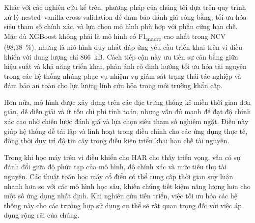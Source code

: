 Khác với các nghiên cứu kể trên, phương pháp của chúng tôi dựa trên quy trình xử lý nested–vanilla cross-validation để đảm bảo đánh giá công bằng, tối ưu hóa siêu tham số chính xác, và lựa chọn mô hình phù hợp với phần cứng hạn chế. Mặc dù XGBoost không phải là mô hình có F1\textsubscript{macro} cao nhất trong NCV (98,38~\%), nhưng là mô hình duy nhất đáp ứng yêu cầu triển khai trên vi điều khiển với dung lượng chỉ 866~kB. Cách tiếp cận này ưu tiên sự cân bằng giữa hiệu suất và khả năng triển khai, phản ánh rõ định hướng tối ưu hóa tài nguyên trong các hệ thống nhúng phục vụ nhiệm vụ giám sát trạng thái tác nghiệp và đảm bảo an toàn cho lực lượng lính cứu hỏa trong môi trường khẩn cấp.

Hơn nữa, mô hình được xây dựng trên các đặc trưng thống kê miền thời gian đơn giản, dễ diễn giải và ít tốn chi phí tính toán, nhưng vẫn đủ mạnh để đạt độ chính xác cao nhờ chiến lược đánh giá và lựa chọn siêu tham số nghiêm ngặt. Điều này giúp hệ thống dễ tái lập và linh hoạt trong điều chỉnh cho các ứng dụng thực tế, đồng thời duy trì độ tin cậy trong điều kiện triển khai hạn chế tài nguyên.

Trong khi học máy trên vi điều khiển cho HAR cho thấy triển vọng, vẫn có sự đánh đổi giữa độ phức tạp của mô hình, độ chính xác và mức tiêu thụ tài nguyên. Các thuật toán học máy cổ điển có thể cung cấp thời gian suy luận nhanh hơn so với các mô hình học sâu, khiến chúng tiết kiệm năng lượng hơn cho một số ứng dụng nhất định. Khi nghiên cứu tiến triển, việc tối ưu hóa các hệ thống này cho các trường hợp sử dụng cụ thể sẽ rất quan trọng đối với việc áp dụng rộng rãi của chúng.